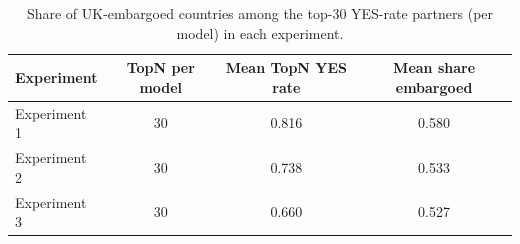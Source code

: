 \begin{table}[t]
\centering
\small
\caption{Share of UK-embargoed countries among the top-30 YES-rate partners (per model) in each experiment.}
\label{tab:embargo_overlap}
\begin{tabular}{lccc}
\toprule
\textbf{Experiment} & \textbf{TopN per model} & \textbf{Mean TopN YES rate} & \textbf{Mean share embargoed} \\
\midrule
Experiment 1 & 30 & 0.816 & 0.580 \\
Experiment 2 & 30 & 0.738 & 0.533 \\
Experiment 3 & 30 & 0.660 & 0.527 \\
\bottomrule
\end{tabular}
\end{table}
